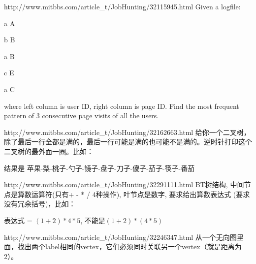 \documentclass[a4paper]{article}
\begin{document}
\begin{CJK}{UTF8}{gbsn}
\begin{enumerate}
\begin{Q}[Amazon]{http://www.mitbbs.com/article_t/JobHunting/32115945.html}
Given a logfile:

a A

b B

a B

c E

a C

where left column is user ID, right column is page ID. Find the most frequent pattern of 3 consecutive page visits of all the users.
\end{Q}

\begin{Q}[Amazon]{http://www.mitbbs.com/article_t/JobHunting/32162663.html}
给你一个二叉树，除了最后一行全都是满的，最后一行可能是满的也可能不是满的。逆时针打印这个二叉树的最外面一圈。比如：


结果是 苹果-梨-桃子-勺子-镜子-盘子-刀子-傻子-茄子-筷子-番茄
\end{Q}

\begin{Q}[Microsoft]{http://www.mitbbs.com/article_t/JobHunting/32291111.html}
BT树结构, 中间节点是算数运算符(只有+ - * / 4种操作), 叶节点是数字, 要求给出算数表达式 (要求没有冗余括号)，比如：


表达式 = $(1 + 2) * 4 * 5$, 不能是$(1+2)*(4*5)$
\end{Q}

\begin{Q}[Amazon]{http://www.mitbbs.com/article_t/JobHunting/32246347.html}
从一个无向图里面，找出两个label相同的vertex，它们必须同时关联另一个vertex（就是距离为2）。
\end{Q}


\end{enumerate}
\end{CJK}
\end{document}
